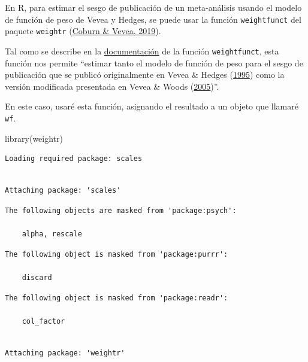 \documentclass[
  bookmarksnumbered]{article}
\newenvironment{Shaded}{\begin{snugshade}}{\end{snugshade}}
\newcommand{\FunctionTok}[1]{\textcolor[rgb]{0.39,0.29,0.61}{#1}}
\newcommand{\NormalTok}[1]{\textcolor[rgb]{0.12,0.11,0.11}{#1}}
\begin{document}
En R, para estimar el sesgo de publicación de un meta-análisis usando el modelo de función de peso de Vevea y Hedges, se puede usar la función \texttt{weightfunct} del paquete \texttt{weightr} (\protect\hyperlink{ref-coburnWeightr2019}{Coburn \& Vevea, 2019}).

Tal como se describe en la \href{https://www.rdocumentation.org/packages/weightr/versions/2.0.2/topics/weightfunct}{documentación} de la función \texttt{weightfunct}, esta función nos permite ``estimar tanto el modelo de función de peso para el sesgo de publicación que se publicó originalmente en Vevea \& Hedges (\protect\hyperlink{ref-veveaGeneralLinearModel1995}{1995}) como la versión modificada presentada en Vevea \& Woods (\protect\hyperlink{ref-veveaPublicationBiasResearch2005}{2005})''.

En este caso, usaré esta función, asignando el resultado a un objeto que llamaré \texttt{wf}.

\begin{Shaded}
\begin{Highlighting}[]
\FunctionTok{library}\NormalTok{(weightr)}
\end{Highlighting}
\end{Shaded}

\begin{verbatim}
Loading required package: scales
\end{verbatim}

\begin{verbatim}

Attaching package: 'scales'
\end{verbatim}

\begin{verbatim}
The following objects are masked from 'package:psych':

    alpha, rescale
\end{verbatim}

\begin{verbatim}
The following object is masked from 'package:purrr':

    discard
\end{verbatim}

\begin{verbatim}
The following object is masked from 'package:readr':

    col_factor
\end{verbatim}

\begin{verbatim}

Attaching package: 'weightr'
\end{verbatim}
\end{document}
